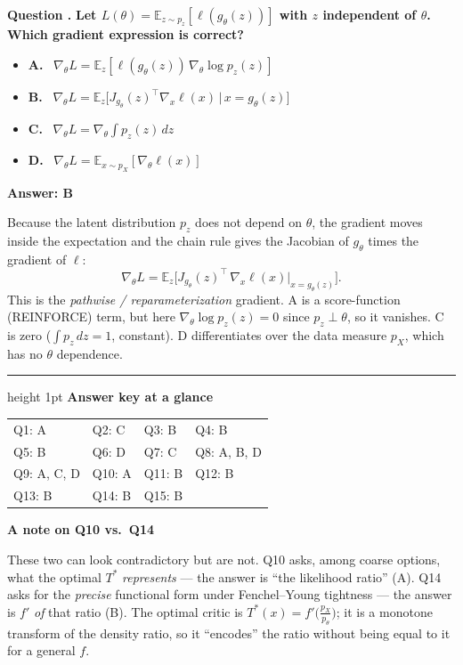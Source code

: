 \documentclass[11pt]{article}
\newcounter{qcounter}
\newcommand{\question}[1]{%
  \refstepcounter{qcounter}%
  \vspace{0.7em}%
  {\large\bfseries\color{accent}Question \theqcounter.}\enspace
  {\bfseries #1}\par\vspace{0.3em}%
}
\newenvironment{answer}{%
  \begin{mdframed}[backgroundcolor=ansbg,linecolor=ansrule,linewidth=0.8pt,
    roundcorner=4pt,innertopmargin=6pt,innerbottommargin=6pt,
    innerleftmargin=8pt,innerrightmargin=8pt,skipabove=6pt,skipbelow=4pt]%
}{\end{mdframed}}
\newenvironment{optionbox}{%
  \begin{mdframed}[backgroundcolor=boxbg,linecolor=boxrule,linewidth=0.6pt,
    roundcorner=3pt,innertopmargin=5pt,innerbottommargin=5pt,
    innerleftmargin=8pt,innerrightmargin=8pt,skipabove=4pt,skipbelow=6pt]%
}{\end{mdframed}}
\newcommand{\optlist}[1]{\begin{itemize}[leftmargin=1.6em,itemsep=2pt,topsep=2pt,label={}]#1\end{itemize}}
\newcommand{\opt}[2]{\item \textbf{#1.}~ #2}
\newcommand{\correct}[1]{\textcolor{ansgreen}{\textbf{Answer: #1}}}
\begin{document}
\question{Let $L(\theta)=\mathbb{E}_{z\sim p_z}[\ell(g_\theta(z))]$ with $z$ independent of $\theta$. Which gradient expression is correct?}
\begin{optionbox}
\optlist{
\opt{A}{$\nabla_\theta L=\mathbb{E}_z[\ell(g_\theta(z))\,\nabla_\theta\log p_z(z)]$}
\opt{B}{$\nabla_\theta L=\mathbb{E}_z\big[J_{g_\theta}(z)^\top\nabla_x\ell(x)\,\big|\,x=g_\theta(z)\big]$}
\opt{C}{$\nabla_\theta L=\nabla_\theta\int p_z(z)\,dz$}
\opt{D}{$\nabla_\theta L=\mathbb{E}_{x\sim p_X}[\nabla_\theta\ell(x)]$}
}
\end{optionbox}
\begin{answer}
\correct{B}\par\vspace{2pt}
Because the latent distribution $p_z$ does not depend on $\theta$, the gradient moves inside the expectation and the chain rule gives the Jacobian of $g_\theta$ times the gradient of $\ell$:
\[
\nabla_\theta L=\mathbb{E}_z\big[J_{g_\theta}(z)^\top\,\nabla_x\ell(x)\big|_{x=g_\theta(z)}\big].
\]
This is the \emph{pathwise / reparameterization} gradient. A is a score-function (REINFORCE) term, but here $\nabla_\theta\log p_z(z)=0$ since $p_z\perp\theta$, so it vanishes. C is zero ($\int p_z\,dz=1$, constant). D differentiates over the data measure $p_X$, which has no $\theta$ dependence.
\end{answer}

\vspace{0.6em}
\hrule height 1pt
\vspace{0.6em}
{\large\bfseries\color{accent} Answer key at a glance}\par\vspace{0.3em}
\begin{tabular}{@{}llll@{}}
Q1: A & Q2: C & Q3: B & Q4: B\\
Q5: B & Q6: D & Q7: C & Q8: A, B, D\\
Q9: A, C, D & Q10: A & Q11: B & Q12: B\\
Q13: B & Q14: B & Q15: B &\\
\end{tabular}

\vspace{0.6em}
{\large\bfseries\color{accent} A note on Q10 vs.\ Q14}\par\vspace{0.2em}
These two can look contradictory but are not. Q10 asks, among coarse options, what the optimal $T^*$ \emph{represents} — the answer is ``the likelihood ratio'' (A). Q14 asks for the \emph{precise} functional form under Fenchel--Young tightness — the answer is $f'$ \emph{of} that ratio (B). The optimal critic is $T^*(x)=f'\!\big(\tfrac{p_X}{p_\theta}\big)$; it is a monotone transform of the density ratio, so it ``encodes'' the ratio without being equal to it for a general $f$.
\end{document}
